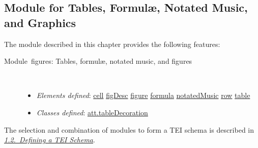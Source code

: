 \subsection[{Module for Tables, Formulæ, Notated Music, and Graphics}]{Module for Tables, Formulæ, Notated Music, and Graphics}\par
The module described in this chapter provides the following features: \begin{description}

\item[{Module figures: Tables, formulæ, notated music, and figures}]\hspace{1em}\hfill\linebreak
\mbox{}\\[-10pt] \begin{itemize}
\item {\itshape Elements defined}: \hyperref[TEI.cell]{cell} \hyperref[TEI.figDesc]{figDesc} \hyperref[TEI.figure]{figure} \hyperref[TEI.formula]{formula} \hyperref[TEI.notatedMusic]{notatedMusic} \hyperref[TEI.row]{row} \hyperref[TEI.table]{table}
\item {\itshape Classes defined}: \hyperref[TEI.att.tableDecoration]{att.tableDecoration}
\end{itemize} 
\end{description}  The selection and combination of modules to form a TEI schema is described in \textit{\hyperref[STIN]{1.2.\ Defining a TEI Schema}}.